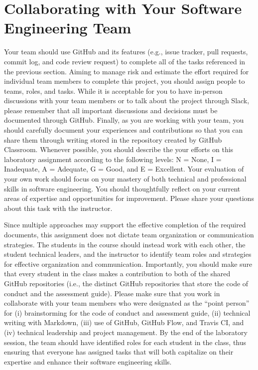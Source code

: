 \documentclass[11pt]{article}
\begin{document}
\section*{Collaborating with Your Software Engineering Team}

Your team should use GitHub and its features (e.g., issue tracker, pull
requests, commit log, and code review request) to complete all of the tasks
referenced in the previous section.
%
Aiming to manage risk and estimate the effort required for individual team
members to complete this project, you should assign people to teams, roles, and
tasks. While it is acceptable for you to have in-person discussions with your
team members or to talk about the project through Slack, please remember that
all important discussions and decisions must be documented through GitHub.
Finally, as you are working with your team, you should carefully document your
experiences and contributions so that you can share them through writing stored
in the repository created by GitHub Classroom.
%
Whenever possible, you should describe the your efforts on this laboratory
assignment according to the following levels: N = None, I = Inadequate, A =
Adequate, G = Good, and E = Excellent. Your evaluation of your own work should
focus on your mastery of both technical and professional skills in software
engineering. You should thoughtfully reflect on your current areas of expertise
and opportunities for improvement. Please share your questions about this task
with the instructor.

Since multiple approaches may support the effective completion of the required
documents, this assignment does not dictate team organization or communication
strategies. The students in the course should instead work with each other, the
student technical leaders, and the instructor to identify team roles and
strategies for effective organization and communication. Importantly, you should
make sure that every student in the class makes a contribution to both of the
shared GitHub repositories (i.e., the distinct GitHub repositories that store
the code of conduct and the assessment guide).
%
Please make sure that you work in collaborate with your team members who were
designated as the ``point person'' for (i) brainstorming for the code of conduct
and assessment guide, (ii) technical writing with Markdown, (iii) use of GitHub,
GitHub Flow, and Travis CI, and (iv) technical leadership and project
management.
%
By the end of the laboratory session, the team should have identified roles for
each student in the class, thus ensuring that everyone has assigned tasks that
will both capitalize on their expertise and enhance their software engineering
skills.
\end{document}
